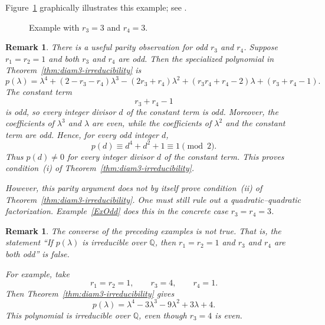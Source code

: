 \documentclass[11pt]{amsart}
\newtheorem{rem}[thm]{\bf Remark}
\begin{document}
Figure~\ref{FigEx33} graphically illustrates this example; see \cite[p.~14]{Lewis2026}.

\begin{figure}[htb]
\centering
{}
\caption{Example with \(r_3=3\) and \(r_4=3\).}
\label{FigEx33}
\end{figure}

\begin{rem}\label{rem:parity}
There is a useful parity observation for odd \(r_3\) and \(r_4\). Suppose \(r_1=r_2=1\) and both \(r_3\) and \(r_4\) are odd. Then the specialized polynomial in Theorem~\ref{thm:diam3-irreducibility} is
\[
p(\lambda)
=
\lambda^4+(2-r_3-r_4)\lambda^3
-(2r_3+r_4)\lambda^2
+(r_3r_4+r_4-2)\lambda
+(r_3+r_4-1).
\]
The constant term
\[
r_3+r_4-1
\]
is odd, so every integer divisor \(d\) of the constant term is odd. Moreover, the coefficients of \(\lambda^3\) and \(\lambda\) are even, while the coefficients of \(\lambda^2\) and the constant term are odd. Hence, for every odd integer \(d\),
\[
p(d)\equiv d^4+d^2+1\equiv 1\pmod{2}.
\]
Thus \(p(d)\neq 0\) for every integer divisor \(d\) of the constant term. This proves condition~\textup{(i)} of
Theorem~\ref{thm:diam3-irreducibility}.

However, this parity argument does not by itself prove condition~\textup{(ii)} of Theorem~\ref{thm:diam3-irreducibility}. One must still rule out a quadratic--quadratic factorization. Example~\ref{ExOdd} does this in the concrete case \(r_3=r_4=3\).
\end{rem}

\begin{rem}\label{rem:converse-false}
The converse of the preceding examples is not true. That is, the statement ``If \(p(\lambda)\) is irreducible over \(\mathbb Q\), then
\(r_1=r_2=1\) and \(r_3\) and \(r_4\) are both odd'' is false.

For example, take
\[
r_1=r_2=1,\qquad r_3=4,\qquad r_4=1.
\]
Then Theorem~\ref{thm:diam3-irreducibility} gives
\[
p(\lambda)
=
\lambda^4-3\lambda^3-9\lambda^2+3\lambda+4.
\]
This polynomial is irreducible over \(\mathbb Q\), even though \(r_3=4\) is
even.
\end{rem}
\end{document}
